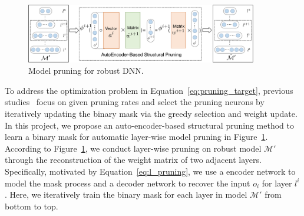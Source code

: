   \begin{figure}[!t]
    \centering
    \includegraphics[width=0.9\textwidth]{fig/RP_TASK3_pruning.pdf}
    \caption{Model pruning for robust DNN.}
    \label{fig:task3_pruning}
\end{figure}

 To address the optimization problem in Equation~\eqref{eq:pruning_target}, previous studies~\cite{luo2017thinet, jiang2018efficient} focus on given pruning rates and select the pruning neurons by iteratively updating the binary mask via the greedy selection and weight update. In this project, we propose an auto-encoder-based structural pruning method to learn a binary mask for automatic layer-wise model pruning in Figure~\ref{fig:task3_pruning}. According to Figure~\ref{fig:task3_pruning}, we conduct layer-wise pruning on robust model $\mathcal{M}'$ through the reconstruction of the weight matrix of two adjacent layers. Specifically, motivated by Equation~\eqref{eq:l_pruning}, we use a encoder network to model the mask process and a decoder network to recover the input $o_i$ for layer $l^i$. Here, we iteratively train the binary mask for each layer in model $\mathcal{M}'$ from bottom to top. 
 
